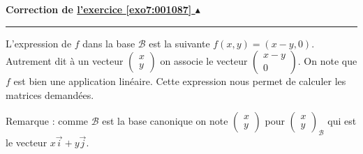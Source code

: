 \documentclass[11pt,a4paper]{article}
\newcounter{exo}
\newcommand{\correction}[1]{\hypertarget{cor7:#1}{}\label{cor7:#1}{\bf Correction de \hyperlink{exo7:#1}{l'exercice \ref{exo7:#1} $\blacktriangle$}}\vspace{1mm}\hrule\vspace{1mm}}
\begin{document}
\newpage

\correction{001087}
L'expression de $f$ dans la base $\mathcal{B}$ est la suivante $f(x,y)=(x-y,0)$.
Autrement dit à un vecteur $\begin{pmatrix}x\\y\end{pmatrix}$ on associe
le vecteur  $\begin{pmatrix}x-y\\0\end{pmatrix}$.
On note que $f$ est bien une application linéaire.
Cette expression nous permet de calculer les matrices demandées.


Remarque : comme $\mathcal{B}$ est la base canonique on note
$\begin{pmatrix}x\\y\end{pmatrix}$ pour $\begin{pmatrix}x\\y\end{pmatrix}_\mathcal{B}$
qui est le vecteur $x \vec{i}+y\vec{j}$.
\end{document}
